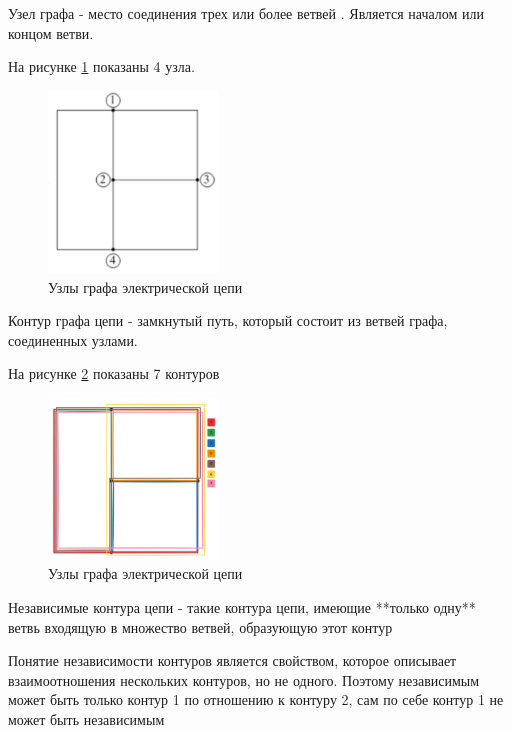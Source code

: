 Узел графа - место соединения трех или более ветвей . Является началом или концом ветви. 

На рисунке \ref{fig:graph3} показаны 4 узла.

\begin{figure}[H]
    \centering
    \includegraphics[width=0.4\textwidth]{images/image_3_contures_nodes_branches.png}
    \caption{Узлы графа электрической цепи}
    \label{fig:graph3}
\end{figure}

Контур графа цепи - замкнутый путь, который состоит из ветвей графа, соединенных узлами.

На рисунке \ref{fig:graph4} показаны 7 контуров

\begin{figure}[H]
    \centering
    \includegraphics[width=0.4\textwidth]{images/image_4_contures_nodes_branches.png}
    \caption{Узлы графа электрической цепи}
    \label{fig:graph4}
\end{figure}

Независимые контура цепи - такие контура цепи, имеющие **только одну** ветвь входящую в множество ветвей, образующую этот контур 

Понятие независимости контуров является свойством, которое описывает взаимоотношения нескольких контуров, но не одного. Поэтому независимым может быть только контур 1 по отношению к контуру 2, сам по себе контур 1 не может быть независимым

